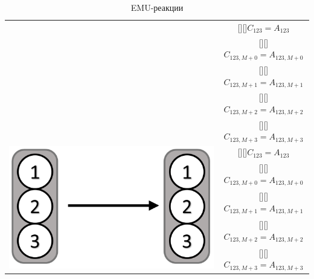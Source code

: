 \documentclass[14pt, a4paper]{extreport}
\newcommand{\adj}[1]{\raisebox{-2pt}[\height][\depth]{#1}}
\begin{document}
\begin{table}
\begin{center}
\begin{tabular}{c | c}
{\begin{minipage}{0.3\linewidth}
			 	\end{minipage}
			 } 
		     & \adj{$C_{123} = A_{123}$}\\[.5ex]
			 & \adj{$C_{123,M+0} = A_{123,M+0}$}\\ [.5ex]
			 & \adj{$C_{123,M+1} = A_{123,M+1}$}\\ [.5ex]
			 & \adj{$C_{123,M+2} = A_{123,M+2}$} \\ [.5ex]
			 & \adj{$C_{123,M+3} = A_{123,M+3}$} \\ [.5ex]
			 \hline 
			 \multirow{5}{*}[-1mm]{
			 	\begin{minipage}{0.3\linewidth}
			 		\centering{Унимолекулярная реакция}
			 		\includegraphics[scale=0.85]{EMU_reaction_3.png}
			 	\end{minipage}
			 } 
		     & \adj{$C_{123} = A_{123}$}\\[.5ex]
				& \adj{$C_{123,M+0} = A_{123,M+0}$}\\ [.5ex]
				& \adj{$C_{123,M+1} = A_{123,M+1}$}\\ [.5ex]
				& \adj{$C_{123,M+2} = A_{123,M+2}$} \\ [.5ex]
				& \adj{$C_{123,M+3} = A_{123,M+3}$} \\ [.5ex]
			 \hline 
		\end{tabular}
		\caption{EMU-реакции}
		\label{EMU_reactions}
	\end{center}
\end{table}
\end{document}
